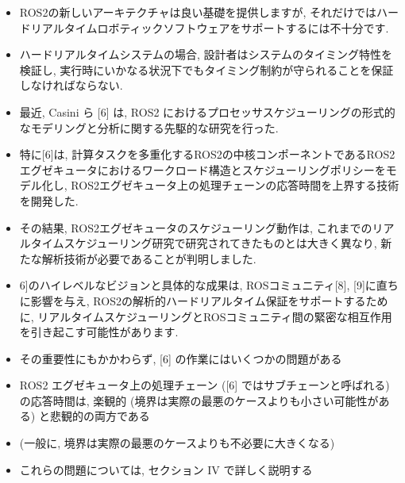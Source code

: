 \begin{frame}{}
    \begin{itemize}
        \item ROS2の新しいアーキテクチャは良い基礎を提供しますが, それだけではハードリアルタイムロボティックソフトウェアをサポートするには不十分です.
        \item ハードリアルタイムシステムの場合, 設計者はシステムのタイミング特性を検証し, 実行時にいかなる状況下でもタイミング制約が守られることを保証しなければならない.
        \item 最近, Casini ら [6] は, ROS2 におけるプロセッサスケジューリングの形式的なモデリングと分析に関する先駆的な研究を行った.
        \item 特に[6]は, 計算タスクを多重化するROS2の中核コンポーネントであるROS2エグゼキュータにおけるワークロード構造とスケジューリングポリシーをモデル化し, ROS2エグゼキュータ上の処理チェーンの応答時間を上界する技術を開発した.
    \end{itemize}
\end{frame}

\begin{frame}{}
    \begin{itemize}
        \item その結果, ROS2エグゼキュータのスケジューリング動作は, これまでのリアルタイムスケジューリング研究で研究されてきたものとは大きく異なり, 新たな解析技術が必要であることが判明しました.
        \item 6]のハイレベルなビジョンと具体的な成果は, ROSコミュニティ[8], [9]に直ちに影響を与え, ROS2の解析的ハードリアルタイム保証をサポートするために, リアルタイムスケジューリングとROSコミュニティ間の緊密な相互作用を引き起こす可能性があります.
    \end{itemize}
\end{frame}


\begin{frame}{}
    \begin{itemize}
        \item その重要性にもかかわらず, [6] の作業にはいくつかの問題がある
        \item ROS2 エグゼキュータ上の処理チェーン ([6] ではサブチェーンと呼ばれる) の応答時間は, 楽観的 (境界は実際の最悪のケースよりも小さい可能性がある) と悲観的の両方である
        \item (一般に, 境界は実際の最悪のケースよりも不必要に大きくなる)
        \item これらの問題については, セクション IV で詳しく説明する
    \end{itemize}
\end{frame}

